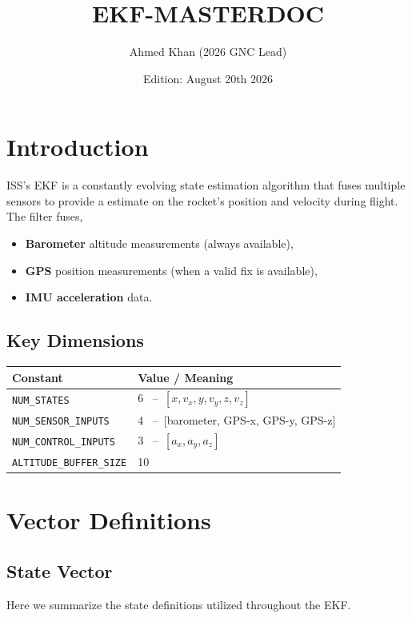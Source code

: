 \documentclass{article}
\title{EKF-MASTERDOC}
\author{Ahmed Khan (2026 GNC Lead)}
\date{Edition: August 20th 2026}
\begin{document}
\maketitle

\tableofcontents
\newpage
\section{Introduction}

ISS's EKF is a constantly evolving state estimation algorithm that fuses multiple sensors to provide a estimate on the rocket's position and velocity during flight. The filter fuses, 
\begin{itemize}[nosep]
    \item \textbf{Barometer} altitude measurements (always available),
    \item \textbf{GPS} position measurements (when a valid fix is available),
    \item \textbf{IMU acceleration} data.
\end{itemize}


\subsection{Key Dimensions}

\begin{table}[h]
\centering
\begin{tabular}{@{}ll@{}}
\toprule
\textbf{Constant} & \textbf{Value / Meaning} \\
\midrule
\texttt{NUM\_STATES} & 6 \, --\, $[x, v_x, y, v_y, z, v_z]$ \\
\texttt{NUM\_SENSOR\_INPUTS} & 4 \, --\, [barometer, GPS-x, GPS-y, GPS-z] \\
\texttt{NUM\_CONTROL\_INPUTS} & 3 \, --\, $[a_x, a_y, a_z]$ \\
\texttt{ALTITUDE\_BUFFER\_SIZE} & 10 \\
\bottomrule
\end{tabular}
\end{table}

\section{Vector Definitions}
\subsection{State Vector}
Here we summarize the state definitions utilized throughout the EKF. 
\end{document}
